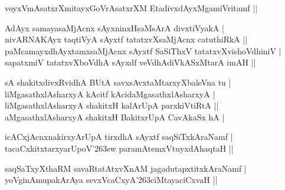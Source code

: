 \begin{entry}
\begin{shl}
voyxVmAsatxrXmitayxGoVrAsatxrXM EtadivxdAyxMgamiVritamf ||\\[-1pt]
\end{shl}
\medskip
{}
\medskip
{}
\medskip
\begin{shl}
AdAyx samayasaMjAcnx sAyxninxHsaMsArA divxtiVyakA |\\[2pt]
nivARNAKAyx taqtiVyA sAyxtf tatatxvXsaMjAcnx catuthiRkA ||\\[2pt]
paMcamayxdhAyxtamxsaMjAcnx sAyxtf SaSiThxV tatatxvXvishoVdhiniV |\\[2pt]
sapatxmiV tatatxvXboVdhA sAyxdf veVdhAdiVkASxMtarA imAH ||\\[-1pt]
\end{shl}
\medskip
{}
\medskip
{}
\medskip
\begin{shl}
sA shakitxdivxRvidhA BUtA savxsAvxtaMtarxyXbaleVna tu |\\[2pt]
liMgasathxlAsharxyA kAcitf kAcidaMgasathxlAsharxyA |\\[2pt]
liMgasathxlAsharxyA shakitxH kalArUpA parxkiVtiRtA ||\\[2pt]
aMgasathxlAsharxyA shakitxH BakitxrUpA CavAkaSx hA |\\[-1pt]
\end{shl}
\medskip
{}
\medskip
\begin{shl}
icACxjAcnxnakirxyArUpA tirxdhA sAyxtf saqSiTxkAraNamf |\\[2pt]
tacaCxkitxtarxyarUpoV{\char'263}sw paramAtemxVtuyxdAhaqtaH ||\\[-1pt]
\end{shl}
\medskip
{}
\medskip
{}
\medskip
\begin{shl}
saqSaTxyXthaRM savaRtatAtxvXnAM jagadutapxtitxkAraNamf |\\[2pt]
yoVginAmupakArAya sevxVcaCxyA{\char'263}ciMtayaciCxvaH ||\\[2pt]

\end{shl}
\end{entry}
